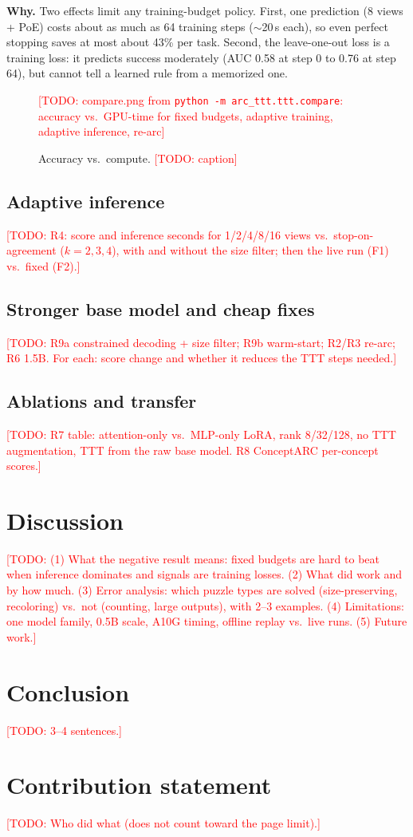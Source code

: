 \documentclass{article}
\newcommand{\todo}[1]{\textcolor{red}{[TODO: #1]}}
\begin{document}
\textbf{Why.} Two effects limit any training-budget policy. First, one prediction (8 views + PoE) costs about as much as 64 training steps ($\sim$20\,s each), so even perfect stopping saves at most about 43\% per task. Second, the leave-one-out loss is a training loss: it predicts success moderately (AUC 0.58 at step 0 to 0.76 at step 64), but cannot tell a learned rule from a memorized one.

\begin{figure}[t]
\centering
\todo{compare.png from \texttt{python -m arc\_ttt.ttt.compare}: accuracy vs.\ GPU-time for fixed budgets, adaptive training, adaptive inference, re-arc}
\caption{Accuracy vs.\ compute. \todo{caption}}
\label{fig:compute}
\end{figure}

\subsection{Adaptive inference}
\todo{R4: score and inference seconds for 1/2/4/8/16 views vs.\ stop-on-agreement ($k=2,3,4$), with and without the size filter; then the live run (F1) vs.\ fixed (F2).}

\subsection{Stronger base model and cheap fixes}
\todo{R9a constrained decoding + size filter; R9b warm-start; R2/R3 re-arc; R6 1.5B. For each: score change and whether it reduces the TTT steps needed.}

\subsection{Ablations and transfer}
\todo{R7 table: attention-only vs.\ MLP-only LoRA, rank 8/32/128, no TTT augmentation, TTT from the raw base model. R8 ConceptARC per-concept scores.}

\section{Discussion}
\todo{(1) What the negative result means: fixed budgets are hard to beat when inference dominates and signals are training losses. (2) What did work and by how much. (3) Error analysis: which puzzle types are solved (size-preserving, recoloring) vs.\ not (counting, large outputs), with 2--3 examples. (4) Limitations: one model family, 0.5B scale, A10G timing, offline replay vs.\ live runs. (5) Future work.}

\section{Conclusion}
\todo{3--4 sentences.}

\section*{Contribution statement}
\todo{Who did what (does not count toward the page limit).}

\printbibliography
\end{document}
